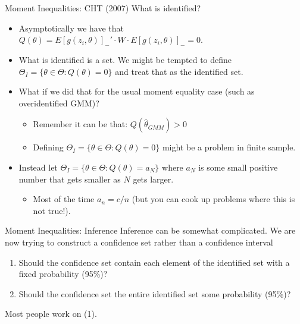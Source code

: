 \documentclass[xcolor=pdftex,dvipsnames,table,mathserif]{beamer}
\begin{document}
\begin{frame}{Moment Inequalities: CHT (2007)}
What is identified?
\begin{itemize}
\item Asymptotically we have that  $Q(\theta) = E[g(z_i,\theta)]_{-}' \cdot W \cdot E[g(z_i,\theta)]_{-}  = 0$.
\item What is identified is a \alert{set}. We might be tempted to define $\Theta_I = \{ \theta \in \Theta : Q(\theta) = 0\}$ and treat that as the \alert{identified set}.
\item What if we did that for the usual moment equality case (such as overidentified GMM)?
\begin{itemize}
\item Remember it can be that: $Q(\hat{\theta}_{GMM}) > 0$
\item Defining $\Theta_I = \{ \theta \in \Theta : Q(\theta) = 0\}$ might be a problem in finite sample.
\end{itemize}
\item Instead let $\Theta_I = \{ \theta \in \Theta : Q(\theta) = a_N\}$ where $a_N$ is some small positive number that gets smaller as $N$ gets larger.
\begin{itemize}
\item Most of the time $a_n = c / n$ (but you can cook up problems where this is not true!).
\end{itemize}
\end{itemize}
\end{frame}


\begin{frame}{Moment Inequalities: Inference}
Inference can be somewhat complicated.  We are now trying to construct a \alert{confidence set} rather than a \alert{confidence interval}
\begin{enumerate}
\item Should the confidence set contain each element of the identified set with a fixed probability (95\%)?
\item Should the confidence set the entire identified set some probability (95\%)?
\end{enumerate}
Most people work on (1).
\end{frame}
\end{document}
